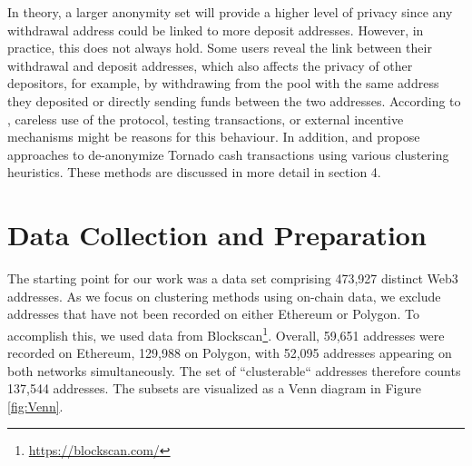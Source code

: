 \documentclass[12pt,a4paper,titlepage,oneside,english]{article}
\begin{document}
In theory, a larger anonymity set will provide a higher level of privacy since any withdrawal address could be linked to more deposit addresses. However, in practice, this does not always hold.
Some users reveal the link between their withdrawal and deposit addresses, which also affects the privacy of other depositors, for example, by withdrawing from the pool with the same address they deposited or directly sending funds between the two addresses. According to \cite{nadler2023tornado}, careless use of the protocol, testing transactions, or external incentive mechanisms might be reasons for this behaviour. \newline
In addition, \cite{Beres2020} and \cite{wu2022tutela} propose approaches to de-anonymize Tornado cash transactions using various clustering heuristics. These methods are discussed in more detail in section 4.




\section{Data Collection and Preparation} 
The starting point for our work was a data set comprising 473,927 distinct Web3 addresses. %
 As we focus on clustering methods using on-chain data, we exclude addresses that have not been recorded on either Ethereum or Polygon. To accomplish this, we used data from Blockscan\footnote{\url{https://blockscan.com/}}. Overall, 59,651 addresses were recorded on Ethereum, 129,988 on Polygon, with 52,095 addresses appearing on both networks simultaneously. The set of ``clusterable`` addresses therefore counts 137,544 addresses. The subsets are visualized as a Venn diagram in Figure \ref{fig:Venn}.
 
\end{document}

